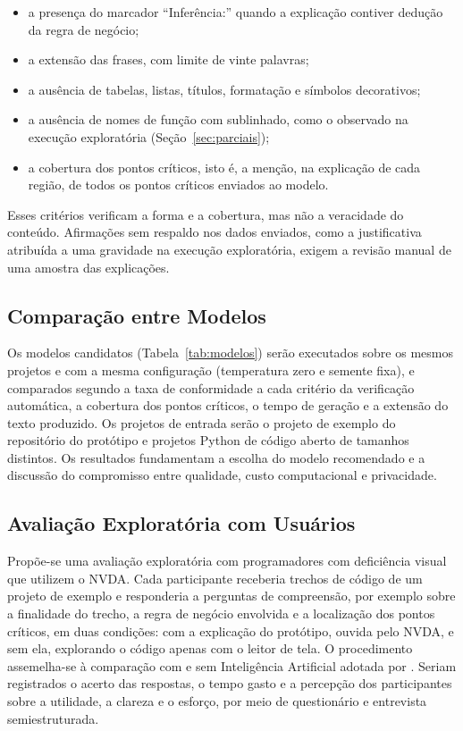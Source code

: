 \documentclass[
    12pt,                   %
    openright,              %
    oneside,                %
    a4paper,                %
    sumario=tradicional,    %
    english,                %
    brazil,                 %
    ]{abntex2}
\begin{document}
\begin{itemize}
  \item a presença do marcador \enquote{Inferência:} quando a explicação contiver dedução da regra de negócio;
  \item a extensão das frases, com limite de vinte palavras;
  \item a ausência de tabelas, listas, títulos, formatação e símbolos decorativos;
  \item a ausência de nomes de função com sublinhado, como o observado na execução exploratória (Seção~\ref{sec:parciais});
  \item a cobertura dos pontos críticos, isto é, a menção, na explicação de cada região, de todos os pontos críticos enviados ao modelo.
\end{itemize}

Esses critérios verificam a forma e a cobertura, mas não a veracidade do conteúdo. Afirmações sem respaldo nos dados enviados, como a justificativa atribuída a uma gravidade na execução exploratória, exigem a revisão manual de uma amostra das explicações.

\subsection{Comparação entre Modelos}\label{sec:comparacao}

Os modelos candidatos (Tabela~\ref{tab:modelos}) serão executados sobre os mesmos projetos e com a mesma configuração (temperatura zero e semente fixa), e comparados segundo a taxa de conformidade a cada critério da verificação automática, a cobertura dos pontos críticos, o tempo de geração e a extensão do texto produzido. Os projetos de entrada serão o projeto de exemplo do repositório do protótipo e projetos Python de código aberto de tamanhos distintos. Os resultados fundamentam a escolha do modelo recomendado e a discussão do compromisso entre qualidade, custo computacional e privacidade.

\subsection{Avaliação Exploratória com Usuários}\label{sec:usuarios}

Propõe-se uma avaliação exploratória com programadores com deficiência visual que utilizem o NVDA. Cada participante receberia trechos de código de um projeto de exemplo e responderia a perguntas de compreensão, por exemplo sobre a finalidade do trecho, a regra de negócio envolvida e a localização dos pontos críticos, em duas condições: com a explicação do protótipo, ouvida pelo NVDA, e sem ela, explorando o código apenas com o leitor de tela. O procedimento assemelha-se à comparação com e sem Inteligência Artificial adotada por \textcite{latinoware34224}. Seriam registrados o acerto das respostas, o tempo gasto e a percepção dos participantes sobre a utilidade, a clareza e o esforço, por meio de questionário e entrevista semiestruturada.
\end{document}
